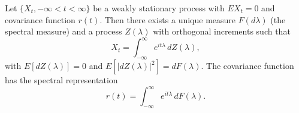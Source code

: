 Let $\{X_t, -\infty < t < \infty\}$ be a weakly stationary process with $EX_t = 0$ and covariance function $r(t)$. Then there exists a unique measure $F(d\lambda)$ (the spectral measure) and a process $Z(\lambda)$ with orthogonal increments such that
$$X_t = \int_{-\infty}^{\infty} e^{it\lambda} \, dZ(\lambda),$$
with $E[dZ(\lambda)] = 0$ and $E[|dZ(\lambda)|^2] = dF(\lambda)$. The covariance function has the spectral representation
$$r(t) = \int_{-\infty}^{\infty} e^{it\lambda} \, dF(\lambda).$$
